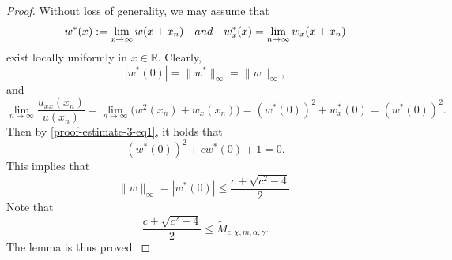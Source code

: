 \documentclass[10pt,a4paper]{amsart}
\newcommand\RR{\ensuremath{\mathbb{R}}}
\begin{document}
\begin{proof}
  Without loss of generality, we may assume that
$$
w^*(x):=\lim_{x\to\infty} w(x+x_n) \quad {\rm and} \quad w^*_x(x)=\lim_{n\to\infty} w_x(x+x_n)
$$
exist locally uniformly in $x\in\RR$.  Clearly,
$$
|w^*(0)|=\|w^*\|_\infty=\|w\|_\infty,
$$
and 
$$
\lim_{n\to\infty} \frac{u_{xx}(x_n)}{u(x_n)}=\lim_{n\to\infty} \big(w^2(x_n)+w_x(x_n)\big)=(w^*(0))^2+w_x^*(0)=(w^*(0))^2.
$$
Then  by \eqref{proof-estimate-3-eq1}, it holds that
$$
(w^*(0))^2+cw^*(0) +1=0.
$$
This implies that
$$
\|w\|_\infty=|w^*(0)|\le \frac{c+\sqrt{c^2-4}}{2}.
$$
Note that
$$
\frac{c+\sqrt{c^2-4}}{2}\le \widetilde M_{c,\chi,m,\alpha,\gamma}.
$$
The lemma is thus proved.
\end{proof}
\end{document}
